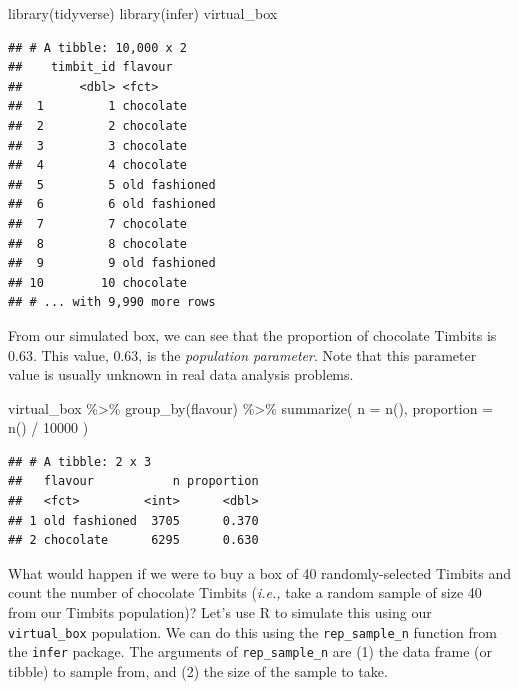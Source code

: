 \documentclass[
]{krantz}
\makeatletter
\newenvironment{Shaded}{\begin{snugshade}}{\end{snugshade}}
\newcommand{\AttributeTok}[1]{\textcolor[rgb]{0.61,0.61,0.61}{#1}}
\newcommand{\DecValTok}[1]{\textcolor[rgb]{0.06,0.06,0.06}{#1}}
\newcommand{\FunctionTok}[1]{\textcolor[rgb]{0,0,0}{#1}}
\newcommand{\NormalTok}[1]{#1}
\newcommand{\SpecialCharTok}[1]{\textcolor[rgb]{0,0,0}{#1}}
\newenvironment{kframe}{%
\medskip{}
\setlength{\fboxsep}{.8em}
 \def\at@end@of@kframe{}%
 \ifinner\ifhmode%
  \def\at@end@of@kframe{\end{minipage}}%
  \begin{minipage}{\columnwidth}%
 \fi\fi%
 \def\FrameCommand##1{\hskip\@totalleftmargin \hskip-\fboxsep
 \colorbox{shadecolor}{##1}\hskip-\fboxsep
     \hskip-\linewidth \hskip-\@totalleftmargin \hskip\columnwidth}%
 \MakeFramed {\advance\hsize-\width
   \@totalleftmargin\z@ \linewidth\hsize
   \@setminipage}}%
 {\par\unskip\endMakeFramed%
 \at@end@of@kframe}
\renewenvironment{Shaded}{\begin{kframe}}{\end{kframe}}
\makeatother
\begin{document}
\begin{Shaded}
\begin{Highlighting}[]
\FunctionTok{library}\NormalTok{(tidyverse)}
\FunctionTok{library}\NormalTok{(infer)}
\NormalTok{virtual\_box}
\end{Highlighting}
\end{Shaded}

\begin{verbatim}
## # A tibble: 10,000 x 2
##    timbit_id flavour      
##        <dbl> <fct>        
##  1         1 chocolate    
##  2         2 chocolate    
##  3         3 chocolate    
##  4         4 chocolate    
##  5         5 old fashioned
##  6         6 old fashioned
##  7         7 chocolate    
##  8         8 chocolate    
##  9         9 old fashioned
## 10        10 chocolate    
## # ... with 9,990 more rows
\end{verbatim}

From our simulated box, we can see that the proportion of chocolate Timbits is
0.63. This value, 0.63, is the \emph{population parameter}. Note that this parameter value is usually unknown in real data analysis problems.

\begin{Shaded}
\begin{Highlighting}[]
\NormalTok{virtual\_box }\SpecialCharTok{\%\textgreater{}\%}
  \FunctionTok{group\_by}\NormalTok{(flavour) }\SpecialCharTok{\%\textgreater{}\%}
  \FunctionTok{summarize}\NormalTok{(}
    \AttributeTok{n =} \FunctionTok{n}\NormalTok{(),}
    \AttributeTok{proportion =} \FunctionTok{n}\NormalTok{() }\SpecialCharTok{/} \DecValTok{10000}
\NormalTok{  )}
\end{Highlighting}
\end{Shaded}

\begin{verbatim}
## # A tibble: 2 x 3
##   flavour           n proportion
##   <fct>         <int>      <dbl>
## 1 old fashioned  3705      0.370
## 2 chocolate      6295      0.630
\end{verbatim}

What would happen if we were to buy a box of 40 randomly-selected Timbits and count the number of chocolate Timbits (\emph{i.e.,} take a random sample of size 40 from our Timbits population)? Let's use R to simulate this using our \texttt{virtual\_box} population. We can do this using the \texttt{rep\_sample\_n} function from the \texttt{infer} package. The arguments
of \texttt{rep\_sample\_n} are (1) the data frame (or tibble) to sample from, and (2) the size of the sample to take.
\end{document}
